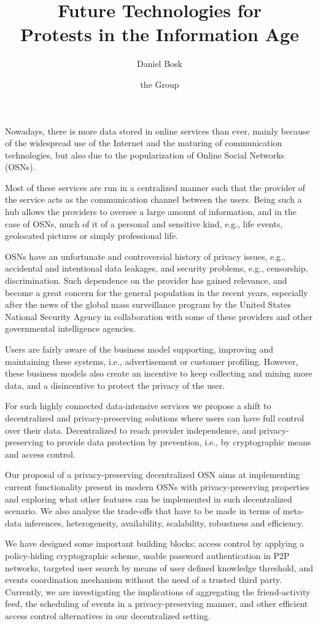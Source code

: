 \documentclass[a4paper]{llncs}
\title{%
  Future Technologies for\\
  Protests in the Information Age
}
\author{%
  Daniel Bosk
  \and
  the Group
}
\institute{%
  School of Computer Science and Communication,\\
  KTH Royal Institute of Technology,
  Stockholm\\
  \email{dbosk@kth.se}
}
\begin{document}
\maketitle

Nowadays, there is more data stored in online services than ever, mainly 
because of the widespread use of the Internet and the maturing of communication 
technologies, but also due to the popularization of Online Social Networks 
(OSNs).

Most of these services are run in a centralized manner such that the provider 
of the service acts as the communication channel between the users.
Being such a hub allows the providers to oversee a large amount of information, 
and in the case of OSNs, much of it of a personal and sensitive kind, e.g., 
life events, geolocated pictures or simply professional life.

OSNs have an unfortunate and controversial history of privacy issues, e.g., 
accidental and intentional data leakages, and security problems, e.g., 
censorship, discrimination.
Such dependence on the provider has gained relevance, and become a great 
concern for the general population in the recent years, especially after the 
news of the global mass surveillance program by the United States National 
Security Agency in collaboration with some of these providers and other
governmental intelligence agencies.

Users are fairly aware of the business model supporting, improving and 
maintaining these systems, i.e., advertisement or customer profiling.
However, these business models also create an incentive to keep collecting and 
mining more data, and a disincentive to protect the privacy of the user.

For such highly connected data-intensive services we propose a shift to 
decentralized and privacy-preserving solutions where users can have full 
control over their data.
Decentralized to reach provider independence, and privacy-preserving
to provide data protection by prevention, i.e., by cryptographic means
and access control.

Our proposal of a privacy-preserving decentralized OSN aims at implementing 
current functionality present in modern OSNs with privacy-preserving properties 
and exploring what other features can be implemented in such decentralized 
scenario.
We also analyse the trade-offs that have to be made in terms of meta-data 
inferences, heterogeneity, availability, scalability, robustness and 
efficiency.

We have designed some important building blocks: access control by applying 
a policy-hiding cryptographic scheme, usable password authentication in P2P 
networks, targeted user search by means of user defined knowledge threshold, 
and events coordination mechanism without the need of a trusted third party.
Currently, we are investigating the implications of aggregating the 
friend-activity feed, the scheduling of events in a privacy-preserving manner, 
and other efficient access control alternatives in our decentralized setting.


\printbibliography{}
\end{document}
